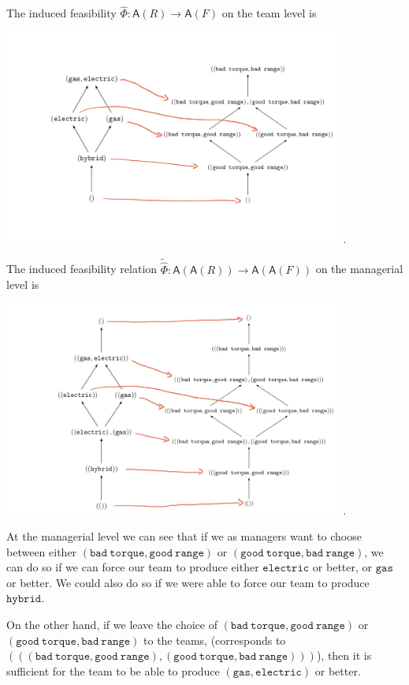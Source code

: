 \documentclass[12pt]{article}
\theoremstyle{definition}
\theoremstyle{plain}
\theoremstyle{plain}
\theoremstyle{plain}
\theoremstyle{plain}
\theoremstyle{remark}
\theoremstyle{remark}
\newcommand{\ac}{\mathsf{A}}
\begin{document}
The induced feasibility $\hat\Phi: \ac(R) \rightarrow \ac(F)$ on the team level is
\begin{center}
	\includegraphics[height=200pt]{section6/6.1/team_level.jpeg}.
\end{center}

The induced feasibility relation $\tilde\hat\Phi: \ac(\ac(R)) \rightarrow \ac(\ac(F))$ on the managerial level is
\begin{center}
	\includegraphics[height=200pt]{section6/6.1/manager_level.jpeg}.
\end{center}

At the managerial level we can see that if we as managers want to choose between either $\mathtt{(bad\ torque, good\ range)}$ or $\mathtt{(good\ torque, bad\ range)}$, we can do so if we can force our team to produce either $\mathtt{electric}$ or better, or $\mathtt{gas}$ or better. We could also do so if we were able to force our team to produce $\mathtt{hybrid}$.

On the other hand, if we leave the choice of $\mathtt{(bad\ torque, good\ range)}$ or $\mathtt{(good\ torque, bad\ range)}$ to the teams, (corresponds to $((\mathtt{(bad\ torque, good\ range)},\mathtt{(good\ torque, bad\ range)}))$), then it is sufficient for the team to be able to produce $\mathtt{(gas,electric)}$ or better.
\end{document}
